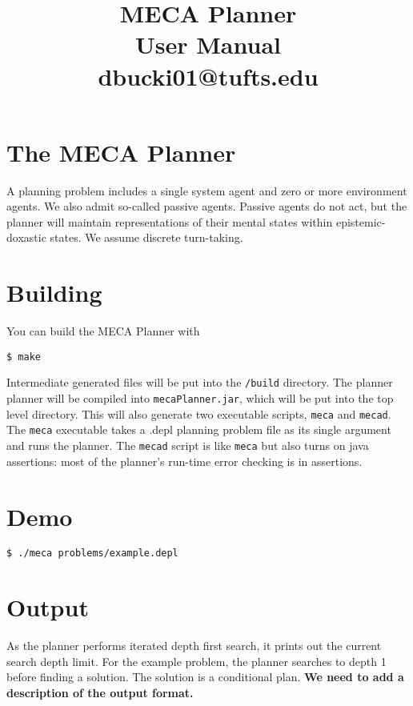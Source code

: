 \documentclass{article}
\title{MECA Planner  \\
\large User Manual \\
dbucki01@tufts.edu
}
\begin{document}
\maketitle

\tableofcontents


\section{The MECA Planner}

A planning problem includes a single system agent and zero or more environment
agents.  We also admit so-called passive agents. Passive agents do not act, but
the planner will maintain representations of their mental states within
epistemic-doxastic states.  We assume discrete turn-taking.


\section{Building}


You can build the MECA Planner with

\begin{lstlisting}
$ make
\end{lstlisting}

Intermediate generated files will be put into the \verb|/build| directory. 
The planner planner will be compiled into \verb|mecaPlanner.jar|, which
will be put into the top level directory. This will also generate two
executable scripts, \verb|meca| and \verb|mecad|.
The \verb|meca| executable takes a .depl planning problem file as its single
argument and runs the planner. The \verb|mecad| script is like \verb|meca| but
also turns on java assertions: most of the planner's run-time error checking is
in assertions.


\section{Demo}

\begin{lstlisting}
$ ./meca problems/example.depl
\end{lstlisting}


\section{Output}

As the planner performs iterated depth first search, it prints out the current
search depth limit. For the example problem, the planner searches to depth 1
before finding a solution.
The solution is a conditional plan.
\textbf{We need to add a description of the output format.}
\end{document}

